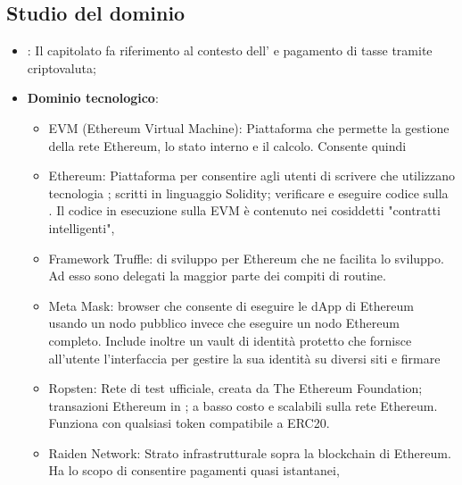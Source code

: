 \subsection{Studio del dominio}
     \begin{itemize}
        \item {}: Il capitolato fa riferimento al contesto dell'  e pagamento di tasse tramite criptovaluta;
        \item \textbf{Dominio tecnologico}:
            \begin{itemize}
                \item EVM (Ethereum Virtual Machine): Piattaforma che permette la gestione della rete Ethereum, lo stato interno e il calcolo. Consente quindi 
                \item Ethereum: Piattaforma per consentire agli utenti di scrivere  che utilizzano tecnologia ;
		        scritti in linguaggio Solidity;
		        verificare e eseguire codice sulla . Il codice in esecuzione sulla EVM è contenuto nei cosiddetti "contratti intelligenti", 
                \item Framework Truffle:  di sviluppo per Ethereum che ne facilita lo sviluppo. Ad esso sono delegati la maggior parte dei compiti di
		        routine.
                \item Meta Mask:  browser che consente di eseguire le dApp di Ethereum usando un nodo pubblico invece che eseguire un nodo Ethereum completo.
		        Include inoltre un vault di identità protetto che fornisce all'utente l'interfaccia per gestire la sua identità su diversi siti e firmare
                 \item Ropsten: Rete di test ufficiale, creata da The Ethereum Foundation;
		        transazioni Ethereum in ; 
		         a basso costo e scalabili sulla rete Ethereum. Funziona con qualsiasi token compatibile a ERC20.
                 \item Raiden Network: Strato infrastrutturale sopra la blockchain di Ethereum. Ha lo scopo di consentire pagamenti quasi istantanei,
            \end{itemize}
    \end{itemize}
